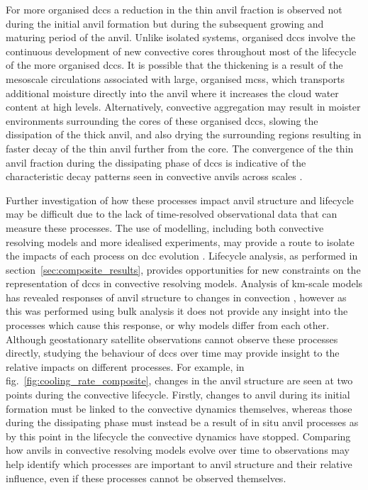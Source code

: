 For more organised \acrshort{dcc}s a reduction in the thin anvil fraction is observed not during the initial anvil formation but during the subsequent growing and maturing period of the anvil.
Unlike isolated systems, organised \acrshort{dcc}s involve the continuous development of new convective cores throughout most of the lifecycle of the more organised \acrshort{dcc}s.
It is possible that the thickening is a result of the mesoscale circulations associated with large, organised \acrshort{mcs}s, which transports additional moisture directly into the anvil where it increases the cloud water content at high levels.  
Alternatively, convective aggregation may result in moister environments surrounding the cores of these organised \acrshort{dcc}s, slowing the dissipation of the thick anvil, and also drying the surrounding regions resulting in faster decay of the thin anvil further from the core.
The convergence of the thin anvil fraction during the dissipating phase of \acrshort{dcc}s is indicative of the characteristic decay patterns seen in convective anvils across scales \citep{roca_simple_2017, elsaesser_simple_2022}.

Further investigation of how these processes impact anvil structure and lifecycle may be difficult due to the lack of time-resolved observational data that can measure these processes.
The use of modelling, including both convective resolving models and more idealised experiments, may provide a route to isolate the impacts of each process on \acrshort{dcc} evolution \citep{gasparini_diurnal_2022}.
Lifecycle analysis, as performed in section~\ref{sec:composite_results}, provides opportunities for new constraints on the representation of \acrshort{dcc}s in convective resolving models.
Analysis of km-scale models has revealed responses of anvil structure to changes in convection \citep{sokol_greater_2024}, however as this was performed using bulk analysis it does not provide any insight into the processes which cause this response, or why models differ from each other.
Although geostationary satellite observations cannot observe these processes directly, studying the behaviour of \acrshort{dcc}s over time may provide insight to the relative impacts on different processes.
For example, in fig.~\ref{fig:cooling_rate_composite}, changes in the anvil structure are seen at two points during the convective lifecycle.
Firstly, changes to anvil during its initial formation must be linked to the convective dynamics themselves, whereas those during the dissipating phase must instead be a result of in situ anvil processes as by this point in the lifecycle the convective dynamics have stopped.
Comparing how anvils in convective resolving models evolve over time to observations may help identify which processes are important to anvil structure and their relative influence, even if these processes cannot be observed themselves.

